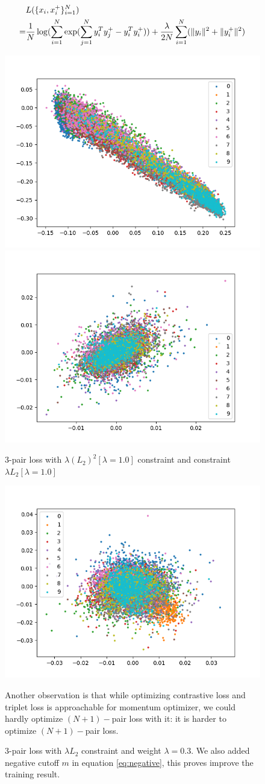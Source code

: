 \documentclass[10pt,twocolumn,letterpaper]{article}
\begin{document}
			\begin{align}
				&L(\{x_i,x_i^+\}^N_{i=1})\notag\\
				=&\frac{1}{N}\log(\sum_{i=1}^N\exp(\sum_{j=1}^Ny^T_iy_j^+-y_i^Ty_i^+))+ \frac{\lambda}{2N} \sum_{i=1}^N(\lVert y_i\rVert^2+ \lVert y^+_i\rVert^2)
			\end{align}
			\begin{figure}[t]

				\begin{center}
				\includegraphics[width=0.5\linewidth]{fig/fig1000}\includegraphics[width=0.5\linewidth]{fig/fig600}
				 \caption{3-pair loss with $\lambda (L_2)^2[\lambda=1.0]$ constraint and constraint $\lambda L_2[\lambda=1.0]$}
   				\includegraphics[width=0.9\linewidth]{fig/fig150}
				\end{center}
   \caption{3-pair loss with $\lambda L_2$ constraint and weight $\lambda=0.3$.  We also added negative cutoff $m$ in equation \ref{eq:negative}, this proves improve the training result.}


   Another observation is that while optimizing contrastive loss and triplet loss is approachable for momentum optimizer, we could hardly optimize $(N+1)-$pair loss with it: it is harder to optimize $(N+1)-$pair loss. 
\end{figure}
\end{document}
